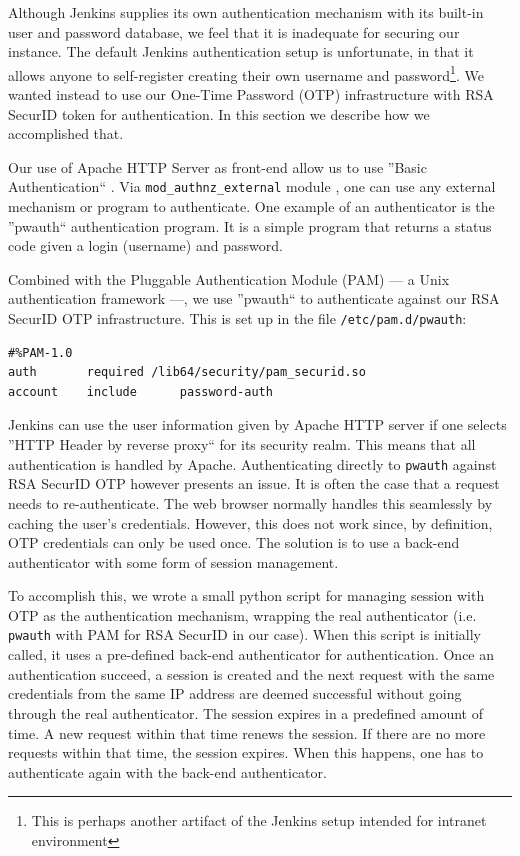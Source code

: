 \documentclass[10pt, conference, compsocconf]{IEEEtran}
\begin{document}
Although Jenkins supplies its own authentication mechanism with its built-in user and password database, we feel that it is inadequate for securing our instance. 
The default Jenkins authentication setup is unfortunate, in that it allows anyone to self-register creating their own username and password\footnote{This is perhaps another artifact of the Jenkins setup intended for intranet environment}. 
We wanted instead to use our One-Time Password (OTP) infrastructure with RSA SecurID \cite{RSASecurID} token for authentication. 
In this section we describe how we accomplished that.

Our use of Apache HTTP Server as front-end allow us to use ''Basic Authentication`` \cite{ApacheBasicAuth}. Via \texttt{mod_authnz_external} module \cite{ApacheModAuthExt}, one can use any external mechanism or program to authenticate. 
One example of an authenticator is the ''pwauth`` authentication program. 
It is a simple program that returns a status code given a login (username) and password. 

Combined with the Pluggable Authentication Module (PAM) --- a Unix authentication framework ---, we use ''pwauth`` to authenticate against our RSA SecurID OTP infrastructure. 
This is set up in the file \texttt{/etc/pam.d/pwauth}:
\begin{lstlisting}
#%PAM-1.0
auth	   required	/lib64/security/pam_securid.so
account    include      password-auth
\end{lstlisting}

Jenkins can use the user information given by Apache HTTP server if one selects ''HTTP Header by reverse proxy`` for its security realm. 
This means that all authentication is handled by Apache. 
Authenticating directly to \texttt{pwauth} against RSA SecurID OTP however presents an issue. 
It is often the case that a request needs to re-authenticate. 
The web browser normally handles this seamlessly by caching the user's credentials.
However, this does not work since, by definition, OTP credentials can only be used once. 
The solution is to use a back-end authenticator with some form of session management. 

To accomplish this, we wrote a small python script for managing session with OTP \cite{BasicAuthOTPSession} as the authentication mechanism, wrapping the real authenticator (i.e. \texttt{pwauth} with PAM for RSA SecurID in our case). 
When this script is initially called, it uses a pre-defined back-end authenticator for authentication. 
Once an authentication succeed, a session is created and the next request with the same credentials from the same IP address are deemed successful without going through the real authenticator. 
The session expires in a predefined amount of time. 
A new request within that time renews the session. 
If there are no more requests within that time, the session expires.
When this happens, one has to authenticate again with the back-end authenticator. 
\end{document}
